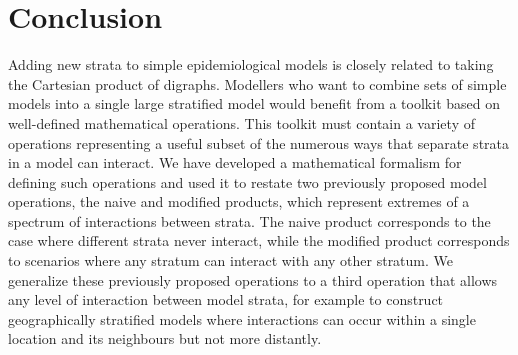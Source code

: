 \documentclass[pdflatex,sn-basic]{sn-jnl}%
\theoremstyle{definition}
\begin{document}
\FloatBarrier
\section{Conclusion}\label{conc}

Adding new strata to simple epidemiological models is closely related to taking the Cartesian product of digraphs. Modellers who want to combine sets of simple models into a single large stratified model would benefit from a toolkit based on well-defined mathematical operations. This toolkit must contain a variety of operations representing a useful subset of the numerous ways that separate strata in a model can interact. We have developed a mathematical formalism for defining such operations and used it to restate two previously proposed model operations, the naive and modified products, which represent extremes of a spectrum of interactions between strata. The naive product corresponds to the case where different strata never interact, while the modified product corresponds to scenarios where any stratum can interact with any other stratum. We generalize these previously proposed operations to a third operation that allows any level of interaction between model strata, for example to construct geographically stratified models where interactions can occur within a single location and its neighbours but not more distantly.
\end{document}
